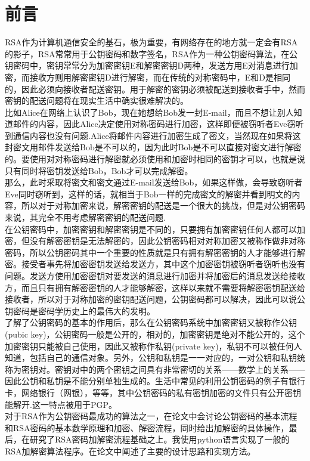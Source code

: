 \documentclass[UTF8,nofonts,cs4size]{ctexrep}
\begin{document}
\chapter*{前言}
RSA作为计算机通信安全的基石，极为重要，有网络存在的地方就一定会有RSA的影子，RSA常常用于公钥密码和数字签名，RSA作为一种公钥密码算法，在公钥密码中，密钥常常分为加密密钥E和解密密钥D两种，发送方用E对消息进行加密，而接收方则用解密密钥D进行解密，而在传统的对称密码中，E和D是相同的，因此必须向接收者配送密钥。用于解密的密钥必须被配送到接收者手中，然而密钥的配送问题将在现实生活中确实很难解决的。\\
\indent 比如Alice在网络上认识了Bob，现在她想给Bob发一封E-mail，而且不想让别人知道邮件的内容，因此Alice决定使用对称密码进行加密，这样即便被窃听者Eve窃听到通信内容也没有问题.Alice将邮件内容进行加密生成了密文，当然现在如果将这封密文用邮件发送给Bob是不可以的，因为此时Bob是不可以直接对密文进行解密的。要使用对对称密码进行解密就必须使用和加密时相同的密钥才可以，也就是说只有同时将密钥发送给Bob，Bob才可以完成解密。\\
\indent  那么，此时采取将密文和密文通过E-mail发送给Bob，如果这样做，会导致窃听者Eve同时窃听到，这样的话，就相当于Bob一样的完成密文的解密并看到明文的内容，所以对于对称加密来说，解密密钥的配送是一个很大的挑战，但是对公钥密码来说，其完全不用考虑解密密钥的配送问题.\\
\indent  在公钥密码中，加密密钥和解密密钥是不同的，只要拥有加密密钥任何人都可以加密，但没有解密密钥是无法解密的，因此公钥密码相对对称加密又被称作做非对称密码，所以公钥密码其中一个重要的性质就是只有拥有解密密钥的人才能够进行解密。接受者事先将加密密钥发送给发送方，其中这个加密密钥被窃听者窃听也没有问题。发送方使用加密密钥对要发送的消息进行加密并将加密后的消息发送给接收方，而且只有拥有解密密钥的人才能够解密，这样以来就不需要将解密密钥配送给接收者，所以对于对称加密的密钥配送问题，公钥密码都可以解决，因此可以说公钥密码是密码学历史上的最伟大的发明。\\
\indent 了解了公钥密码的基本的作用后，那么在公钥密码系统中加密密钥又被称作公钥(pubic key)，公钥密码一般是公开的，相对的，加密密钥是绝对不能公开的，这个加密密钥只能被自己使用，因此又被称作私钥(private key)，私钥不可以被任何人知道，包括自己的通信对象。另外，公钥和私钥是一一对应的，一对公钥和私钥统称为密钥对。密钥对中的两个密钥之间具有非常密切的关系——数学上的关系——因此公钥和私钥是不能分别单独生成的。生活中常见的利用公钥密码的例子有银行卡，网络银行（网银），等等，其中公钥密码的私有密钥加密的文件只有公开密钥能解开.这一特点被用于PGP。\\
\indent 对于RSA作为公钥密码最成功的算法之一，在论文中会讨论公钥密码的基本流程和RSA密码的基本数学原理和加密、解密流程，同时给出加解密的具体操作，最后，在研究了RSA密码加解密流程基础之上。我使用python语言实现了一般的RSA加解密算法程序。在论文中阐述了主要的设计思路和实现方法。
\end{document}

